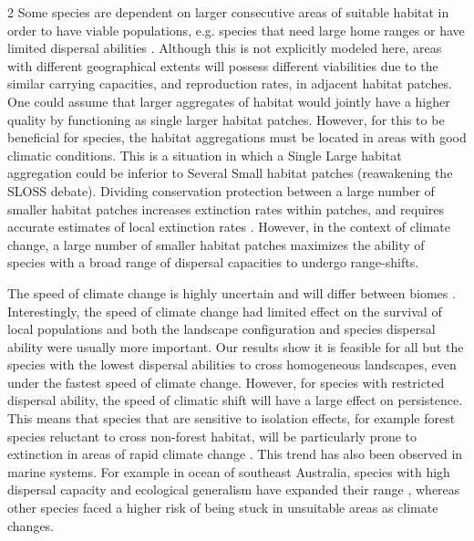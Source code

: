 \documentclass[12pt,pdftex]{article}
\begin{document}
\begin{spacing}{2}
Some species are dependent on larger consecutive areas of suitable habitat in order to have viable populations, e.g. species that need large home ranges or have limited dispersal abilities \citep{Lindenmayer2013, Hanski2011}. Although this is not explicitly modeled here, areas with different geographical extents will possess different viabilities due to the similar carrying capacities, and reproduction rates, in adjacent habitat patches. One could assume that larger aggregates of habitat would jointly have a higher quality by functioning as single larger habitat patches. However, for this to be beneficial for species, the habitat aggregations must be located in areas with good climatic conditions. This is a situation in which a Single Large habitat aggregation could be inferior to Several Small habitat patches (reawakening the SLOSS debate).  Dividing conservation protection between a large number of smaller habitat patches increases extinction rates within patches, and requires accurate estimates of local extinction rates \citep{McCarthy2011, Donaldson2017}. However, in the context of climate change, a large number of smaller habitat patches maximizes the ability of species with a broad range of dispersal capacities to undergo range-shifts. 

 
The speed of climate change is highly uncertain \citep{Stocker2013} and will differ between biomes \citep{Loarie2009}. Interestingly, the speed of climate change had limited effect on the survival of local populations and both the landscape configuration and species dispersal ability were usually more important. Our results show it is feasible for all but the species with the lowest dispersal abilities to cross homogeneous landscapes, even under the fastest speed of climate change. However, for species with restricted dispersal ability, the speed of climatic shift will have a large effect on persistence. This means that species that are sensitive to isolation effects, for example forest species reluctant to cross non-forest habitat, will be particularly prone to extinction in areas of rapid climate change \citep{Melles2011}. This trend has also been observed in marine systems. For example in ocean of southeast Australia, species with high dispersal capacity and ecological generalism have expanded their range \citep{Sunday2015}, whereas other species faced a higher risk of being stuck in unsuitable areas as climate changes.



\end{spacing}
\end{document}
